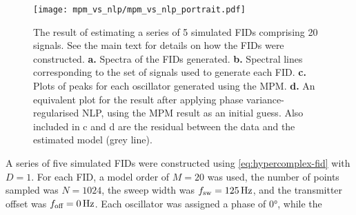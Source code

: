 \begin{figure}
    \centering
    \texttt{[image: mpm\_vs\_nlp/mpm\_vs\_nlp\_portrait.pdf]}
    \caption[
        The result of estimating a series of 5 simulated \acsp{FID}
        using both the \acs{MPM} in isolation, and also with phase
        variance-regularised \acs{NLP} used afterwards.
    ]{
        The result of estimating a series of 5 simulated \acp{FID} comprising
        20 signals. See the main text for details on how the \acp{FID} were
        constructed.
        \textbf{a.} Spectra of the \acp{FID} generated.
        \textbf{b.} Spectral lines corresponding to the set of signals
        used to generate each \ac{FID}.
        \textbf{c.} Plots of peaks for each oscillator generated using
        the \acs{MPM}.
        \textbf{d.} An equivalent plot for the result after applying phase
        variance-regularised \acs{NLP}, using the \acs{MPM} result as an
        initial guess.  Also included in c and d are the
        residual between the data and the estimated model (grey
        line).
    }
    \label{fig:mpm_vs_nlp}
\end{figure}
A series of five simulated \acp{FID} were constructed using
\cref{eq:hypercomplex-fid} with $D=1$. For each \ac{FID}, a model order
of $M=20$ was used, the number of points sampled was $N = 1024$, the sweep
width was $f_{\mathrm{sw}}=\qty{125}{\hertz}$, and the transmitter offset was $f_{\text{off}}
= \qty{0}{\hertz}$.  Each oscillator was assigned a phase of \ang{0}, while the
